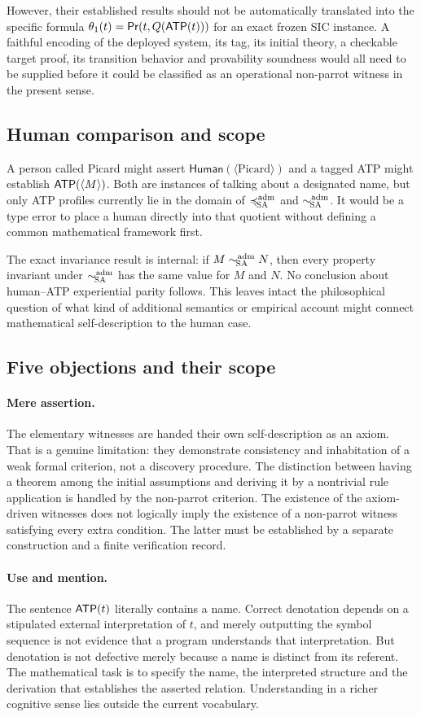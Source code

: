 \documentclass[11pt,letterpaper]{article}
\begin{document}
However, their established results should not be automatically translated into the specific formula $\theta_1(t)=\mathsf{Pr}(t,Q(\mathsf{ATP}(t)))$ for an exact frozen SIC instance. A faithful encoding of the deployed system, its tag, its initial theory, a checkable target proof, its transition behavior and provability soundness would all need to be supplied before it could be classified as an operational non-parrot witness in the present sense.

\subsection{Human comparison and scope}
A person called Picard might assert $\mathsf{Human}(\langle\mathrm{Picard}\rangle)$ and a tagged ATP might establish $\mathsf{ATP}(\langle M\rangle)$. Both are instances of talking about a designated name, but only ATP profiles currently lie in the domain of $\preccurlyeq_{\!\mathrm{SA}}^{\mathrm{adm}}$ and $\sim_{\!\mathrm{SA}}^{\mathrm{adm}}$. It would be a type error to place a human directly into that quotient without defining a common mathematical framework first.

The exact invariance result is internal: if $M\sim_{\!\mathrm{SA}}^{\mathrm{adm}} N$, then every property invariant under $\sim_{\!\mathrm{SA}}^{\mathrm{adm}}$ has the same value for $M$ and $N$. No conclusion about human--ATP experiential parity follows. This leaves intact the philosophical question of what kind of additional semantics or empirical account might connect mathematical self-description to the human case.


\subsection{Five objections and their scope}
\paragraph{Mere assertion.}
The elementary witnesses are handed their own self-description as an axiom. That is a genuine limitation: they demonstrate consistency and inhabitation of a weak formal criterion, not a discovery procedure. The distinction between having a theorem among the initial assumptions and deriving it by a nontrivial rule application is handled by the non-parrot criterion. The existence of the axiom-driven witnesses does not logically imply the existence of a non-parrot witness satisfying every extra condition. The latter must be established by a separate construction and a finite verification record.

\paragraph{Use and mention.}
The sentence $\mathsf{ATP}(t)$ literally contains a name. Correct denotation depends on a stipulated external interpretation of $t$, and merely outputting the symbol sequence is not evidence that a program understands that interpretation. But denotation is not defective merely because a name is distinct from its referent. The mathematical task is to specify the name, the interpreted structure and the derivation that establishes the asserted relation. Understanding in a richer cognitive sense lies outside the current vocabulary.
\end{document}
